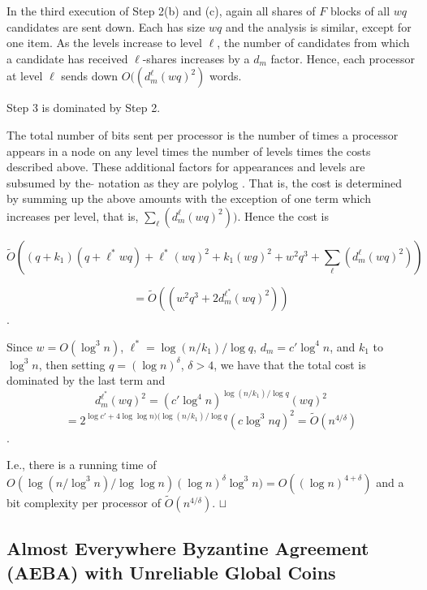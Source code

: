 \documentclass[letterpaper,11pt]{article}
\newcommand{\sq}{\hbox{\rlap{$\sqcap$}$\sqcup$}}
\newcommand{\qed}{\hspace*{\fill}\sq}
\newenvironment{proof}{\noindent {\bf Proof:}}{\qed\par\vskip 4mm\par}
\begin{document}
\begin{proof}
In the third execution of Step 2(b) and (c), again all shares of $F$ blocks of all $wq$ candidates are sent down. Each has size $wq$ and the analysis is similar, except for one item. As the levels increase to level $\ell$, the number of candidates from which a candidate has received $\ell$-shares
increases by a $d_m$ factor. Hence, each processor at level $\ell$ sends down ${O}((d^{\ell}_m (wq)^2)$ words. 

Step 3 is dominated by Step 2.

The total number of bits sent per processor is the number of times a processor appears in a node on any level times the number of levels times
the costs described above. These additional factors  for appearances and levels are subsumed by the $\tilde{}$ notation as they are polylog .
That is, the cost is determined by summing up the above amounts with the exception of one term which increases per level, that is, $\sum_{\ell} (d^{\ell}_m (wq)^2))$. Hence the cost is 

 $$ \tilde{O}((q + k_1)(q + \ell^* wq) + \ell^*(wq)^2  +  k_1 (wg)^2 + w^2 q^3 +
\sum_{\ell} (d^{\ell}_m (wq)^2))$$

$$=\tilde{O}((w^2 q^3 + 2d_m^{\ell^*} (wq)^2))$$.

Since $w=O(\log^3 n)$, $\ell^*= \log (n/k_1)/\log q$,  $d_m = c' \log^4 n$,   and $k_1$ to $\log^3 n$, then setting  $q=(\log n)^{\delta}$, $\delta >4$,   we have that  the total cost is dominated by the last term and $$ d_m^{\ell^*} (wq)^2=
(c' \log^4 n)^{ \log (n/k_1)/\log q} (wq)^2$$$$= 2^{\log c' + 4 \log \log n ) (\log (n/k_1)/\log q} (c\log^3 n q)^2= \tilde{O}(n^{4/\delta})$$.

I.e., there is a running time of $O(\log(n/\log^3 n)/ \log \log n) (\log n)^{\delta}  \log^3 n)=O((\log n)^{4+\delta} )$ and a bit complexity per processor of
$\tilde{O}(n^{4/\delta})$. 
\end{proof}


\subsection{Almost Everywhere Byzantine Agreement (AEBA) with Unreliable Global Coins}\label{AEBACC}
\end{document}
